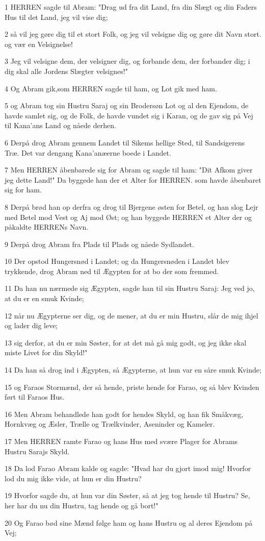 \par 1 HERREN sagde til Abram: "Drag ud fra dit Land, fra din Slægt og din Faders Hus til det Land, jeg vil vise dig;
\par 2 så vil jeg gøre dig til et stort Folk, og jeg vil velsigne dig og gøre dit Navn stort. og vær en Velsignelse!
\par 3 Jeg vil velsigne dem, der velsigner dig, og forbande dem, der forbander dig; i dig skal alle Jordens Slægter velsignes!"
\par 4 Og Abram gik,som HERREN sagde til ham, og Lot gik med ham.
\par 5 og Abram tog sin Hustru Saraj og sin Brodersøn Lot og al den Ejendom, de havde samlet sig, og de Folk, de havde vundet sig i Karan, og de gav sig på Vej til Kana'ans Land og nåede derhen.
\par 6 Derpå drog Abram gennem Landet til Sikems hellige Sted, til Sandsigerens Træ. Det var dengang Kana'anæerne boede i Landet.
\par 7 Men HERREN åbenbarede sig for Abram og sagde til ham: "Dit Afkom giver jeg dette Land!" Da byggede han der et Alter for HERREN. som havde åbenbaret sig for ham.
\par 8 Derpå brød han op derfra og drog til Bjergene østen for Betel, og han slog Lejr med Betel mod Vest og Aj mod Øst; og han byggede HERREN et Alter der og påkaldte HERRENs Navn.
\par 9 Derpå drog Abram fra Plads til Plads og nåede Sydlandet.
\par 10 Der opstod Hungersnød i Landet; og da Hungersnøden i Landet blev trykkende, drog Abram ned til Ægypten for at bo der som fremmed.
\par 11 Da han nu nærmede sig Ægypten, sagde han til sin Hustru Saraj: Jeg ved jo, at du er en smuk Kvinde;
\par 12 når nu Ægypterne ser dig, og de mener, at du er min Hustru, slår de mig ihjel og lader dig leve;
\par 13 sig derfor, at du er min Søster, for at det må gå mig godt, og jeg ikke skal miste Livet for din Skyld!"
\par 14 Da han så drog ind i Ægypten, så Ægypterne, at hun var en såre smuk Kvinde;
\par 15 og Faraos Stormænd, der så hende, priste hende for Farao, og så blev Kvinden ført til Faraos Hus.
\par 16 Men Abram behandlede han godt for hendes Skyld, og han fik Småkvæg, Hornkvæg og Æsler, Trælle og Trælkvinder, Aseninder og Kameler.
\par 17 Men HERREN ramte Farao og hans Hus med svære Plager for Abrams Hustru Sarajs Skyld.
\par 18 Da lod Farao Abram kalde og sagde: "Hvad har du gjort imod mig! Hvorfor lod du mig ikke vide, at hun er din Hustru?
\par 19 Hvorfor sagde du, at hun var din Søster, så at jeg tog hende til Hustru? Se, her har du nu din Hustru, tag hende og gå bort!"
\par 20 Og Farao bød sine Mænd følge ham og hans Hustru og al deres Ejendom på Vej;

